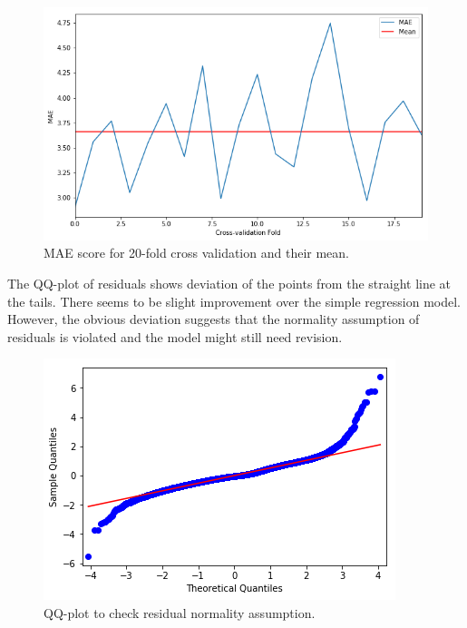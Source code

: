 \documentclass[]{article}
\begin{document}
\begin{figure}[hbtp]
	\centering
	\includegraphics[width=1\columnwidth]{../Figures/cv_mae_complex}
	\caption{MAE score for 20-fold cross validation and their mean.}
	\label{fig:cv_mae_complex}
\end{figure}
%

The QQ-plot of residuals shows deviation of the points from the straight line at the tails. There seems to be slight improvement over the simple regression model. However, the obvious deviation suggests that the normality assumption of residuals is violated and the model might still need revision. 
%
\begin{figure}[hbtp]
	\centering
	\includegraphics[width=.6\columnwidth]{../Figures/normality_check_complex}
	\caption{QQ-plot to check residual normality assumption.}
	\label{fig:qq_plot_complex}
\end{figure}
%
\end{document}
